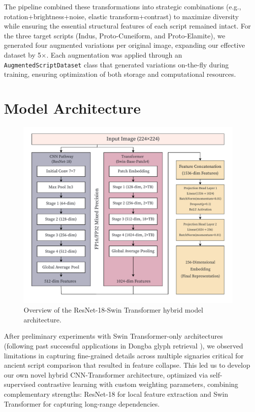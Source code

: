 \documentclass[11pt,a4paper,oneside]{report}
\begin{document}
The pipeline combined these transformations into strategic combinations (e.g., rotation+brightness+noise, elastic transform+contrast) to maximize diversity while ensuring the essential structural features of each script remained intact. For the three target scripts (Indus, Proto-Cuneiform, and Proto-Elamite), we generated four augmented variations per original image, expanding our effective dataset by 5$\times$. Each augmentation was applied through an \texttt{AugmentedScriptDataset} class that generated variations on-the-fly during training, ensuring optimization of both storage and computational resources. 

\newpage
\section{Model Architecture}
\noindent\hspace{1cm}
\begin{figure}[H]  
    \centering  
    \includegraphics[width=0.8\linewidth]{Visualizations/Figures/Architecture.pdf}
    \caption[Hybrid Model Architecture Schematic]{Overview of the ResNet-18-Swin Transformer hybrid model architecture.}
    \label{fig:architecture}
\end{figure}

After preliminary experiments with Swin Transformer-only architectures (following past successful applications in Dongba glyph retrieval \cite{ma_stef_2024}), we observed limitations in capturing fine-grained details across multiple signaries critical for ancient script comparison that resulted in feature collapse. This led us to develop our own novel hybrid CNN-Transformer architecture, optimized via self-supervised contrastive learning with custom weighting parameters, combining complementary strengths: ResNet-18 for local feature extraction and Swin Transformer \cite{liu_swin_2021} for capturing long-range dependencies.
\end{document}
